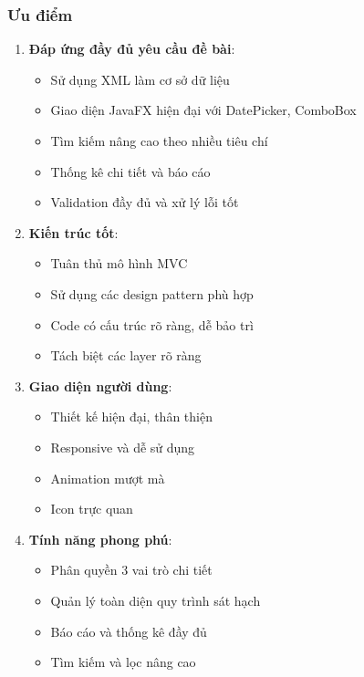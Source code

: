 \documentclass[12pt,a4paper]{article}
\begin{document}
\subsubsection{Ưu điểm}

\begin{enumerate}
    \item \textbf{Đáp ứng đầy đủ yêu cầu đề bài}:
    \begin{itemize}
        \item Sử dụng XML làm cơ sở dữ liệu
        \item Giao diện JavaFX hiện đại với DatePicker, ComboBox
        \item Tìm kiếm nâng cao theo nhiều tiêu chí
        \item Thống kê chi tiết và báo cáo
        \item Validation đầy đủ và xử lý lỗi tốt
    \end{itemize}
    
    \item \textbf{Kiến trúc tốt}:
    \begin{itemize}
        \item Tuân thủ mô hình MVC
        \item Sử dụng các design pattern phù hợp
        \item Code có cấu trúc rõ ràng, dễ bảo trì
        \item Tách biệt các layer rõ ràng
    \end{itemize}
    
    \item \textbf{Giao diện người dùng}:
    \begin{itemize}
        \item Thiết kế hiện đại, thân thiện
        \item Responsive và dễ sử dụng
        \item Animation mượt mà
        \item Icon trực quan
    \end{itemize}
    
    \item \textbf{Tính năng phong phú}:
    \begin{itemize}
        \item Phân quyền 3 vai trò chi tiết
        \item Quản lý toàn diện quy trình sát hạch
        \item Báo cáo và thống kê đầy đủ
        \item Tìm kiếm và lọc nâng cao
    \end{itemize}
\end{enumerate}
\end{document}
